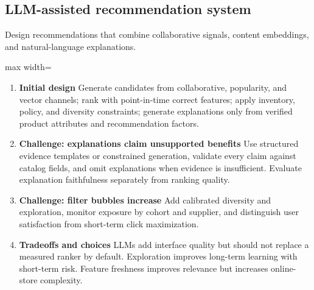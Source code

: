 \subsection{LLM-assisted recommendation system}
Design recommendations that combine collaborative signals, content embeddings, and natural-language explanations.
\begin{center}\begin{adjustbox}{max width=\linewidth}\end{adjustbox}\end{center}
\begin{enumerate}
\item \textbf{Initial design} Generate candidates from collaborative, popularity, and vector channels; rank with point-in-time correct features; apply inventory, policy, and diversity constraints; generate explanations only from verified product attributes and recommendation factors.
\item \textbf{Challenge: explanations claim unsupported benefits} Use structured evidence templates or constrained generation, validate every claim against catalog fields, and omit explanations when evidence is insufficient. Evaluate explanation faithfulness separately from ranking quality.
\item \textbf{Challenge: filter bubbles increase} Add calibrated diversity and exploration, monitor exposure by cohort and supplier, and distinguish user satisfaction from short-term click maximization.
\item \textbf{Tradeoffs and choices} LLMs add interface quality but should not replace a measured ranker by default. Exploration improves long-term learning with short-term risk. Feature freshness improves relevance but increases online-store complexity.
\end{enumerate}
